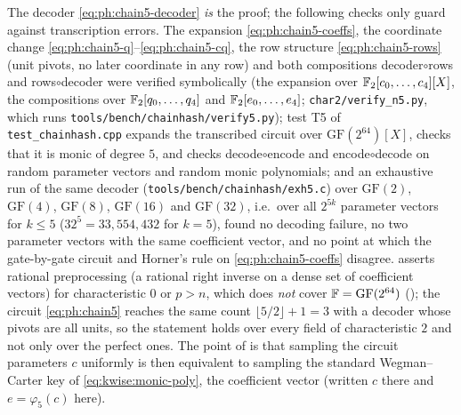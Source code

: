 \begin{remark}\label{rem:ph:thm-main}
The decoder \eqref{eq:ph:chain5-decoder} \emph{is} the proof; the following
checks only guard against transcription errors.  The expansion
\eqref{eq:ph:chain5-coeffs}, the coordinate change
\eqref{eq:ph:chain5-q}--\eqref{eq:ph:chain5-cq}, the row structure
\eqref{eq:ph:chain5-rows} (unit pivots, no later coordinate in any row) and
both compositions decoder$\circ$rows and rows$\circ$decoder were verified
symbolically (the expansion over $\mathbb{F}_2[c_0,\dots,c_4][X]$, the compositions over $\mathbb{F}_2[q_0,\dots,q_4]$ and $\mathbb{F}_2[e_0,\dots,e_4]$; \texttt{char2/verify\_n5.py}, which runs \texttt{tools/bench/chainhash/verify5.py});
test T5 of \texttt{test\_chainhash.cpp} expands the transcribed circuit over
$\mathrm{GF}(2^{64})[X]$, checks that it is monic of degree $5$, and checks
decode$\circ$encode and encode$\circ$decode on random parameter vectors and
random monic polynomials; and an exhaustive run of the same decoder
(\texttt{tools/bench/chainhash/\allowbreak exh5.c}) over $\mathrm{GF}(2)$,
$\mathrm{GF}(4)$, $\mathrm{GF}(8)$, $\mathrm{GF}(16)$ and $\mathrm{GF}(32)$,
i.e.\ over all $2^{5k}$ parameter vectors for $k\le5$ ($32^5=33{,}554{,}432$
for $k=5$), found no decoding failure, no two parameter vectors with the same
coefficient vector, and no point at which the gate-by-gate circuit and
Horner's rule on \eqref{eq:ph:chain5-coeffs} disagree.
 asserts rational preprocessing (a rational right inverse on a dense set of coefficient vectors) for characteristic $0$ or
$p>n$, which does \emph{not} cover $\mathbb{F}=\mathrm{GF}(2^{64})$ ();
the circuit \eqref{eq:ph:chain5} reaches the same count
$\lfloor5/2\rfloor+1=3$ with a decoder whose pivots are all units, so the
statement holds over every field of characteristic $2$ and not only over the
perfect ones.  The point of  is that sampling
the circuit parameters $c$ uniformly is then equivalent to sampling the
standard Wegman--Carter key of \eqref{eq:kwise:monic-poly}, the coefficient vector (written $c$ there and $e=\varphi_5(c)$ here).
\end{remark}

